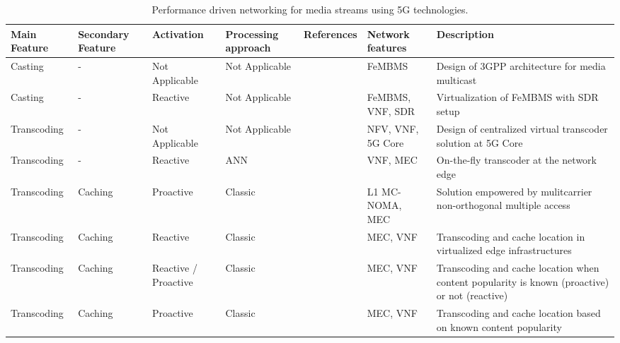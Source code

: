 \begin{table}[htp]
	\caption{Performance driven networking for media streams using 5G technologies.}
	\centering
	\label{tab:IEEECOMSTmedianf}
	\def\arraystretch{1.2}%
	\setlength\tabcolsep{2.0pt} %
	{\scriptsize
		\begin{tabular}{>{\centering\arraybackslash}m{}
			>{\centering\arraybackslash}m{}
			>{\centering\arraybackslash}m{}
			>{\centering\arraybackslash}m{}
			>{\centering\arraybackslash}m{}
			>{\centering\arraybackslash}m{}
			>{\centering\arraybackslash}m{}
		}
		\toprule
		\textbf{Main Feature} & \textbf{Secondary Feature} & \textbf{Activation} & \textbf{Processing approach} & \textbf{References} & \textbf{Network features} & \textbf{Description} \\
		\midrule
		\midrule
		Casting & - & Not Applicable & Not Applicable & \cite{Gimenez2019} & FeMBMS & Design of 3GPP architecture for media multicast \\
		Casting & - & Reactive & Not Applicable & \cite{Gabilondo2020} & FeMBMS, VNF, SDR & Virtualization of FeMBMS with SDR setup \\
		Transcoding & - & Not Applicable & Not Applicable & \cite{Doumanoglou2018} & NFV, VNF, 5G Core & Design of centralized virtual transcoder solution at 5G Core \\
		Transcoding & - & Reactive & ANN & \cite{Dutta2016} & VNF, MEC & On-the-fly transcoder at the network edge \\
		Transcoding & Caching & Proactive & Classic & \cite{Rezvani2019} & L1 MC-NOMA, MEC & Solution empowered by mulitcarrier non-orthogonal multiple access \\
		Transcoding & Caching & Reactive & Classic & \cite{Liu2021} & MEC, VNF & Transcoding and cache location in virtualized edge infrastructures \\
		Transcoding & Caching & Reactive / Proactive & Classic & \cite{Tran2019} & MEC, VNF & Transcoding and cache location when content popularity is known (proactive) or not (reactive) \\
		Transcoding & Caching & Proactive & Classic & \cite{Wang2021, Jia2019} & MEC, VNF & Transcoding and cache location based on known content popularity \\

\end{tabular}}
\end{table}

